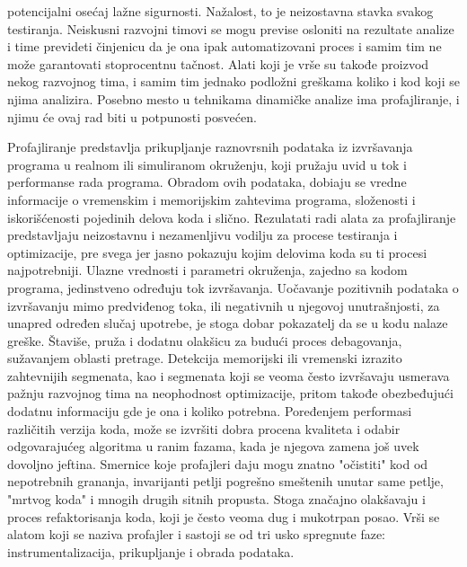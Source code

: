 \documentclass[12pt,oneside]{memoir}
\begin{document}
potencijalni osećaj lažne sigurnosti. Nažalost, to je neizostavna stavka svakog testiranja. Neiskusni razvojni timovi se mogu previse osloniti na rezultate analize i time prevideti činjenicu da je ona ipak automatizovani proces i samim tim ne može garantovati stoprocentnu tačnost. Alati koji je vrše su takođe proizvod nekog razvojnog tima, i samim tim jednako podložni greškama koliko i kod koji se njima analizira. Posebno mesto u tehnikama dinamičke analize ima profajliranje, i njimu će ovaj rad biti u potpunosti posvećen. 


Profajliranje\cite{PGO}\cite{Verifikacija} predstavlja prikupljanje raznovrsnih podataka iz izvršavanja programa u realnom ili simuliranom okruženju, koji pružaju uvid u tok i performanse rada programa. Obradom ovih podataka, dobiaju se vredne informacije o vremenskim i memorijskim zahtevima programa, složenosti i iskorišćenosti pojedinih delova koda i slično. Rezulatati radi alata za profajliranje predstavljaju neizostavnu i nezamenljivu vodilju za procese testiranja i optimizacije, pre svega jer jasno pokazuju kojim delovima koda su ti procesi najpotrebniji. Ulazne vrednosti i parametri okruženja, zajedno sa kodom programa, jedinstveno određuju tok izvršavanja. Uočavanje pozitivnih podataka o izvršavanju mimo predviđenog toka, ili negativnih u njegovoj unutrašnjosti, za unapred određen slučaj upotrebe, je stoga dobar pokazatelj da se u kodu nalaze greške. Štaviše, pruža i dodatnu olakšicu za budući proces debagovanja, sužavanjem oblasti pretrage. Detekcija memorijski ili vremenski izrazito zahtevnijih segmenata, kao i segmenata koji se veoma često izvršavaju usmerava pažnju razvojnog tima na neophodnost optimizacije, pritom takođe obezbeđujući dodatnu informaciju gde je ona i koliko potrebna. Poređenjem performasi različitih verzija koda, može se izvršiti dobra procena kvaliteta i odabir odgovarajućeg algoritma u ranim fazama, kada je njegova zamena još uvek dovoljno jeftina. Smernice koje profajleri daju mogu znatno "očistiti" kod od nepotrebnih grananja, invarijanti petlji pogrešno smeštenih unutar same petlje, "mrtvog koda" i mnogih drugih sitnih propusta. Stoga značajno olakšavaju i proces refaktorisanja koda, koji je često veoma dug i mukotrpan posao. Vrši se alatom koji se naziva profajler i sastoji se od tri usko spregnute faze: instrumentalizacija, prikupljanje i obrada podataka. 
\end{document}
